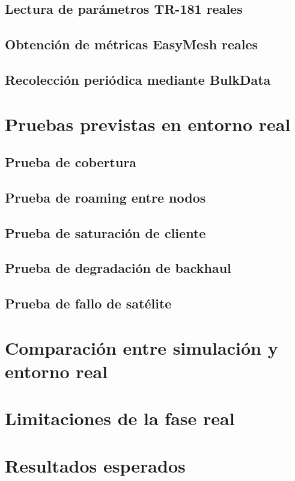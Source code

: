\subsection{Lectura de parámetros TR-181 reales}
\label{subsec:lectura-parametros-tr181-reales}

\subsection{Obtención de métricas EasyMesh reales}
\label{subsec:obtencion-metricas-easymesh-reales}

\subsection{Recolección periódica mediante BulkData}
\label{subsec:recoleccion-periodica-bulkdata}


\section{Pruebas previstas en entorno real}
\label{sec:pruebas-previstas-entorno-real}

\subsection{Prueba de cobertura}
\label{subsec:prueba-cobertura}

\subsection{Prueba de roaming entre nodos}
\label{subsec:prueba-roaming-entre-nodos}

\subsection{Prueba de saturación de cliente}
\label{subsec:prueba-saturacion-cliente}

\subsection{Prueba de degradación de backhaul}
\label{subsec:prueba-degradacion-backhaul}

\subsection{Prueba de fallo de satélite}
\label{subsec:prueba-fallo-satelite}


\section{Comparación entre simulación y entorno real}
\label{sec:comparacion-simulacion-entorno-real}


\section{Limitaciones de la fase real}
\label{sec:limitaciones-fase-real}


\section{Resultados esperados}
\label{sec:resultados-esperados}